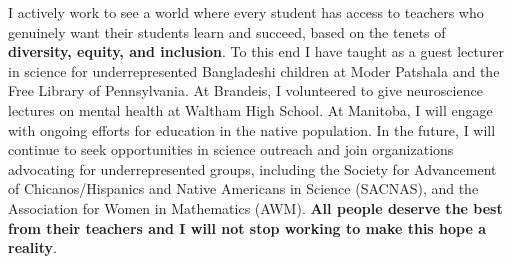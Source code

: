 \documentclass[a4paper,11pt]{article}
\begin{document}
	I actively work to see a world where every student has access to teachers who genuinely want their students learn and succeed, based on the tenets of \textbf{diversity, equity, and inclusion}. To this end I have taught as a guest lecturer in science for underrepresented Bangladeshi children at Moder Patshala and the Free Library of Pennsylvania. At Brandeis, I volunteered to give neuroscience lectures on mental health at Waltham High School. At Manitoba, I will engage with ongoing efforts for education in the native population. In the future, I will continue to seek opportunities in science outreach and join organizations advocating for underrepresented groups, including the Society for Advancement of Chicanos/Hispanics and Native Americans in Science (SACNAS), and the Association for Women in Mathematics (AWM). \textbf{All people deserve the best from their teachers and I will not stop working to make this hope a reality}.
	
	
	\newpage
	
	
	
\end{document}
